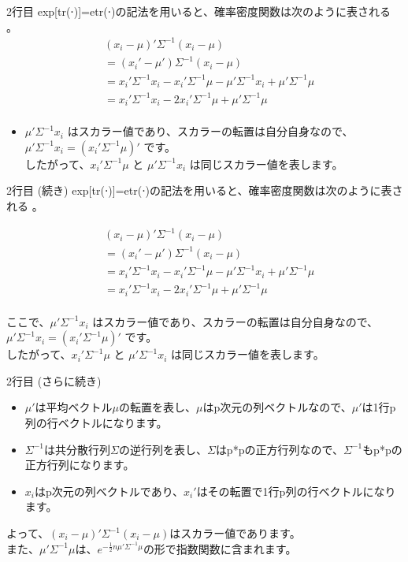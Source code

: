 \documentclass[aspectratio=169]{beamer}
\begin{document}
\begin{frame}{2行目}
exp[tr(⋅)]=etr(⋅)の記法を用いると、確率密度関数は次のように表される 。
\begin{align*}
&(x_i - \mu)'\Sigma^{-1}(x_i - \mu) \\
&= (x_i' - \mu')\Sigma^{-1}(x_i - \mu) \\
&= x_i'\Sigma^{-1}x_i - x_i'\Sigma^{-1}\mu - \mu'\Sigma^{-1}x_i + \mu'\Sigma^{-1}\mu \\
&= x_i'\Sigma^{-1}x_i - 2x_i'\Sigma^{-1}\mu + \mu'\Sigma^{-1}\mu \\
\end{align*}
\begin{itemize}
\item {}\(\mu'\Sigma^{-1}x_i\) はスカラー値であり、スカラーの転置は自分自身なので、\(\mu'\Sigma^{-1}x_i = (x_i'\Sigma^{-1}\mu)'\) です。\\
したがって、\(x_i'\Sigma^{-1}\mu\) と \(\mu'\Sigma^{-1}x_i\) は同じスカラー値を表します。
\end{itemize}
\end{frame}
\begin{frame}{2行目 (続き)} %
exp[tr(⋅)]=etr(⋅)の記法を用いると、確率密度関数は次のように表される 。

\begin{align*}
&(x_i - \mu)'\Sigma^{-1}(x_i - \mu) \\
&= (x_i' - \mu')\Sigma^{-1}(x_i - \mu) \\
&= x_i'\Sigma^{-1}x_i - x_i'\Sigma^{-1}\mu - \mu'\Sigma^{-1}x_i + \mu'\Sigma^{-1}\mu \\
&= x_i'\Sigma^{-1}x_i - 2x_i'\Sigma^{-1}\mu + \mu'\Sigma^{-1}\mu \\
\end{align*}

ここで、$\mu'\Sigma^{-1}x_i$ はスカラー値であり、スカラーの転置は自分自身なので、$\mu'\Sigma^{-1}x_i = (x_i'\Sigma^{-1}\mu)'$ です。\\
したがって、$x_i'\Sigma^{-1}\mu$ と $\mu'\Sigma^{-1}x_i$ は同じスカラー値を表します。

\end{frame}

\begin{frame}{2行目 (さらに続き)} %
\begin{itemize}
    \item $\mu'$は平均ベクトル$\mu$の転置を表し、$\mu$はp次元の列ベクトルなので、$\mu'$は1行p列の行ベクトルになります。
    \item $\Sigma^{-1}$は共分散行列$\Sigma$の逆行列を表し、$\Sigma$はp*pの正方行列なので、$\Sigma^{-1}$もp*pの正方行列になります。
    \item $x_i$はp次元の列ベクトルであり、$x_i'$はその転置で1行p列の行ベクトルになります。
\end{itemize}
よって、$(x_i - \mu)' \Sigma^{-1} (x_i - \mu)$はスカラー値であります。\\
また、$\mu'\Sigma^{-1}\mu\text{は、}e^{-\frac{1}{2}n\mu'\Sigma^{-1}\mu}$の形で指数関数に含まれます。
\end{frame}
\end{document}
